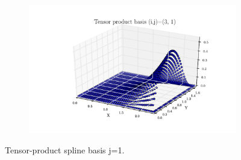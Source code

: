 \documentclass[11pt,letterpaper]{article}
\begin{document}
\begin{figure}[!tbh]
\begin{subfigure}[b]{.6\textwidth}
    \caption{}
    \label{fig3:label:c}
  \end{subfigure}
  \hfill
  \begin{subfigure}[b]{.6\textwidth}
    \includegraphics[width=\textwidth]{problem_2_2_3_1.pdf}
    \caption{}
    \label{fig3:label:d}
  \end{subfigure}
  \caption{Tensor-product spline basis j=1. }
  \end{figure}
\end{document}
